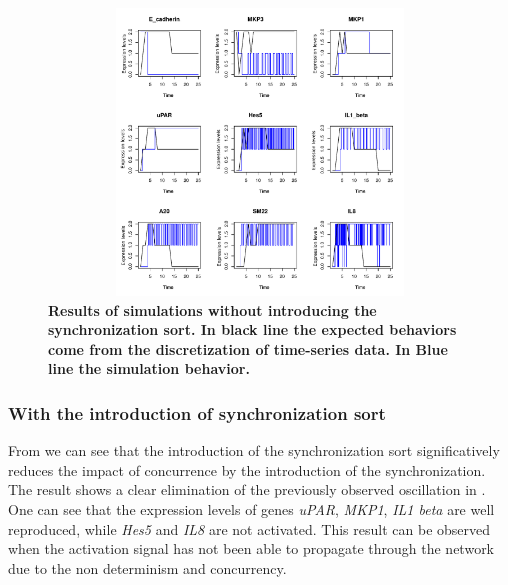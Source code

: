 \begin{figure}[!ht]
\centering
\includegraphics[width=5in,height=3in]{images/resultWOS.pdf}
\caption{\bf Results of simulations without introducing the synchronization sort. In black line the expected behaviors
come from the discretization of time-series data. In Blue line the simulation behavior.}
\label{fig:rwos}
\end{figure}
\subsubsection{With the introduction of synchronization sort}

From  we can see that the introduction of the synchronization sort significatively reduces the 
impact of concurrence by the introduction of the synchronization. The result shows  a 
clear elimination of the previously observed oscillation in . One can see that the expression levels of genes \emph{uPAR}, \emph{MKP1},
\emph{IL1 beta} are well reproduced, while \emph{Hes5} and \emph{IL8} are not activated. This result can be observed when the activation
signal has not been able to propagate through the network due to the non determinism  and concurrency.



